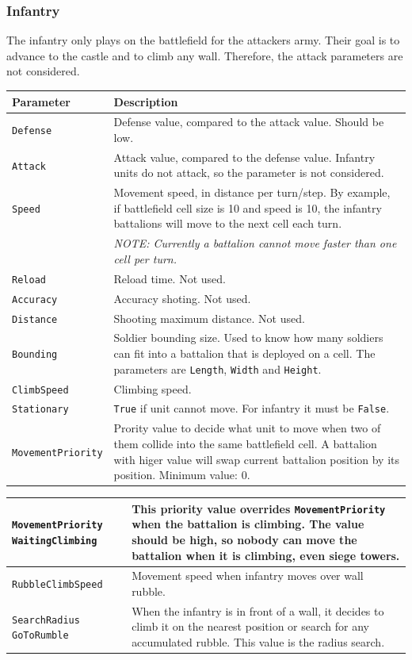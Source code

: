 \documentclass[tog]{acmsiggraph}
\begin{document}
\subsubsection{Infantry}
\label{sec:settingsinfantry}

The infantry only plays on the battlefield for the attackers army. Their goal is to advance to the castle and to climb any wall. 
Therefore, the attack parameters are not considered.

\begin{tabularx}{0.48\textwidth}{ |X|X| }
\hline 
\textbf{Parameter} & \textbf{Description} \\[0.15cm]
 \hline
 \texttt{Defense} & Defense value, compared to the attack value. Should be low. \\
 \hline
 \texttt{Attack} & Attack value, compared to the defense value. Infantry units do not attack, so the parameter is not considered.\\
 \hline
 \texttt{Speed} & Movement speed, in distance per turn/step. By example, if battlefield cell size is 10 and speed is 10, the infantry battalions will move to the next cell each turn. \\
 & \qquad \textit{NOTE: Currently a battalion cannot move faster than one cell per turn.} \\
 \hline 
 \texttt{Reload} & Reload time. Not used. \\
 \hline 
 \texttt{Accuracy} & Accuracy shoting. Not used. \\
 \hline 
 \texttt{Distance} & Shooting maximum distance. Not used.\\
 \hline 
 \texttt{Bounding} & Soldier bounding size. Used to know how many soldiers can fit into a battalion that is deployed on a cell. The parameters are \texttt{Length}, \texttt{Width} and \texttt{Height}. \\
 \hline 
 \texttt{ClimbSpeed} & Climbing speed. \\
 \hline 
 \texttt{Stationary} & \texttt{True} if unit cannot move. For infantry it must be \texttt{False}. \\
 \hline 
 \texttt{MovementPriority} & Prority value to decide what unit to move when two of them collide into the same battlefield cell. A battalion with higer value will swap current battalion position by its position. Minimum value: 0. \\
 \hline 
\end{tabularx} 
 
 
\begin{tabularx}{0.48\textwidth}{ |X|X| }
\hline 
 \texttt{MovementPriority WaitingClimbing} & This priority value overrides \texttt{MovementPriority} when the battalion is climbing. The value should be high, so nobody can move the battalion when it is climbing, even siege towers. \\
 \hline 
 \texttt{RubbleClimbSpeed} & Movement speed when infantry moves over wall rubble. \\
 \hline
 \texttt{SearchRadius GoToRumble} & When the infantry is in front of a wall, it decides to climb it on the nearest position or search for any accumulated rubble. This value is the radius search. \\
 \hline
\end{tabularx} 
 
\end{document}
